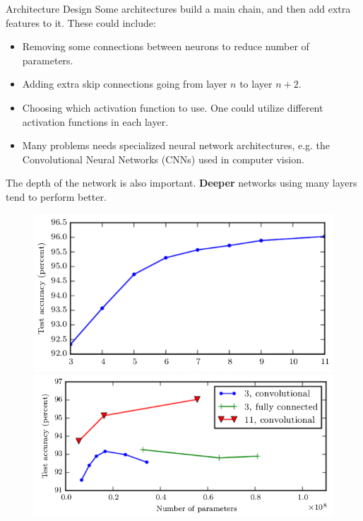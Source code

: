 \documentclass[]{beamer}
\begin{document}
\begin{frame}
   {Architecture Design}
   \scriptsize
   Some architectures build a main chain, and then add extra features to it. These could include:
   \begin{itemize}
      \item
         Removing some connections between neurons to reduce number of parameters.
      \item
         Adding extra skip connections going from layer $n$ to layer $n + 2$.
      \item
         Choosing which activation function to use. One could utilize different activation functions in each layer.
      \item
         Many problems needs specialized neural network architectures, e.g. the Convolutional Neural Networks (CNNs) used in computer vision.
   \end{itemize}
   \vspace{0.2cm}
   The depth of the network is also important. \textbf{Deeper} networks using many layers tend to perform better.
   \begin{figure}
      \includegraphics[width=0.475\linewidth]{figures/accuracy_depth.png}
      \hspace{0.2cm}
      \includegraphics[width=0.475\linewidth]{figures/overfitting_depth.png}
   \end{figure}
\end{frame}
\end{document}
